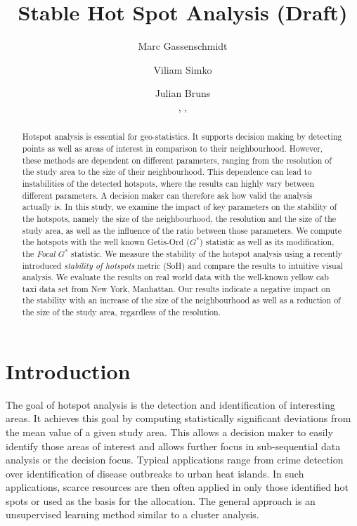 \documentclass{itatnew}
\begin{document}
\title{Stable Hot Spot Analysis (Draft)}

\author{
  Marc Gassenschmidt \and
  Viliam Simko  \and
  Julian Bruns
  \\
  ,
  ,
}

  
\maketitle              %



\begin{abstract}
Hotspot analysis is essential for geo-statistics.
It supports decision making by detecting points
as well as areas of interest in comparison to their
neighbourhood. However, these methods are dependent
on different parameters, ranging from the resolution
of the study area to the size of their neighbourhood.
This dependence can lead to instabilities of the detected
hotspots, where the results can highly vary between
different parameters. A decision maker can therefore ask
how valid the analysis actually is.
%
In this study, we examine the impact of key parameters
on the stability of the hotspots, namely the size of
the neighbourhood, the resolution and the size of the
study area, as well as the influence of the ratio between
those parameters.
%
We compute the hotspots with the well known Getis-Ord ($G^*$)
statistic as well as its modification, the \emph{Focal $G^*$} statistic.
We measure the stability of the hotspot analysis using
a recently introduced \emph{stability of hotspots} metric (SoH)
and compare the results to intuitive visual analysis.
%
We evaluate the results on real world data with the well-known
yellow cab taxi data set from New York, Manhattan.
Our results indicate a negative impact on the stability with
an increase of the size of the neighbourhood as well as
a reduction of the size of the study area, regardless of
the resolution.
\end{abstract}


\section{Introduction}
The goal of hotspot analysis is the detection and identification of interesting areas. It achieves this goal by computing statistically significant deviations from the mean value of a given study area. This allows a decision maker to easily identify those areas of interest and allows further focus in sub-sequential data analysis or the decision focus. Typical applications range from crime detection over identification of disease outbreaks to urban heat islands. In such applications, scarce resources are then often applied in only those identified hot spots or used as the basis for the allocation. The general approach is an unsupervised learning method similar to a cluster analysis. 
\end{document}
